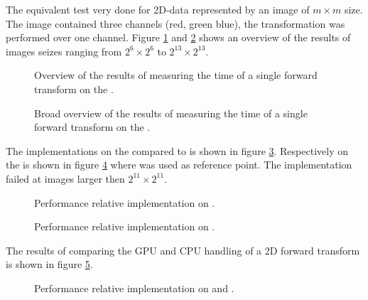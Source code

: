 The equivalent test very done for 2D-data represented by an image of $m{\times}m$ size. The image contained three channels (red, green blue), the transformation was performed over one channel. Figure \ref{fig:gtx:overview-2d} and \ref{fig:r260x:overview-2d} shows an overview of the results of images seizes ranging from $2^{6}{\times}2^{6}$ to $2^{13}{\times}2^{13}$.

\begin{figure}[\AllPlacementOptions]
	\centering
	
	\caption{Overview of the results of measuring the time of a single forward transform on the \NVCARD.}
	\label{fig:gtx:overview-2d}
\end{figure}

\begin{figure}[\AllPlacementOptions]
	\centering
	
	\caption{Broad overview of the results of measuring the time of a single forward transform on the {\AMDCARD}.}
	\label{fig:r260x:overview-2d}
\end{figure}

The implementations on the {\NVCARD} compared to {\CU} is shown in figure \ref{fig:gtx:implementation-2d}. Respectively on the {\AMDCARD} is shown in figure \ref{fig:r260x:implementation-2d} where {\OCL} was used as reference point. The {\GL} implementation failed at images larger then $2^{11}{\times}2^{11}$.

\begin{figure}[\AllPlacementOptions]
	\centering
	
	\caption{Performance relative {\CU} implementation on {\NVCARD}.}
	\label{fig:gtx:implementation-2d}
\end{figure}

\begin{figure}[\AllPlacementOptions]
	\centering
	
	\caption{Performance relative {\OCL} implementation on {\AMDCARD}.}
	\label{fig:r260x:implementation-2d}
\end{figure}

The results of comparing the GPU and CPU handling of a 2D forward transform is shown in figure \ref{fig:gtx:cpu-2d}.

\begin{figure}[\AllPlacementOptions]
	\centering
	
	\caption{Performance relative {\CU} implementation on {\NVCARD} and {\INTELCPU}.}
	\label{fig:gtx:cpu-2d}
\end{figure}

